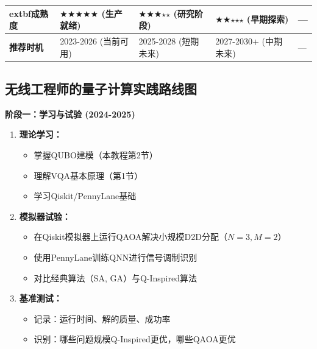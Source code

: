 \documentclass[11pt,a4paper]{article}
\newcommand{\blackstar}{\ensuremath{\bigstar}}
\newcommand{\whitestar}{\ensuremath{\star}}
\begin{document}
\begin{table}[H]
\begin{tabular}{@{}p{2cm}p{3.5cm}p{3.5cm}p{3.5cm}p{2.5cm}@{}}
    extbf{成熟度} & 
\blackstar\blackstar\blackstar\blackstar\blackstar \newline
(生产就绪) & 
\blackstar\blackstar\blackstar\whitestar\whitestar \newline
(研究阶段) & 
\blackstar\blackstar\whitestar\whitestar\whitestar \newline
(早期探索) & 
— \\ \midrule

\textbf{推荐时机} & 
2023-2026 \newline
(当前可用) & 
2025-2028 \newline
(短期未来) & 
2027-2030+ \newline
(中期未来) & 
— \\

\bottomrule
\end{tabular}
\end{table}

\subsection{无线工程师的量子计算实践路线图}

\textbf{阶段一：学习与试验 (2024-2025)}

\begin{enumerate}
\item \textbf{理论学习：}
\begin{itemize}
\item 掌握QUBO建模（本教程第2节）
\item 理解VQA基本原理（第1节）
\item 学习Qiskit/PennyLane基础
\end{itemize}

\item \textbf{模拟器试验：}
\begin{itemize}
\item 在Qiskit模拟器上运行QAOA解决小规模D2D分配（$N=3, M=2$）
\item 使用PennyLane训练QNN进行信号调制识别
\item 对比经典算法（SA, GA）与Q-Inspired算法
\end{itemize}

\item \textbf{基准测试：}
\begin{itemize}
\item 记录：运行时间、解的质量、成功率
\item 识别：哪些问题规模Q-Inspired更优，哪些QAOA更优
\end{itemize}
\end{enumerate}
\end{document}
